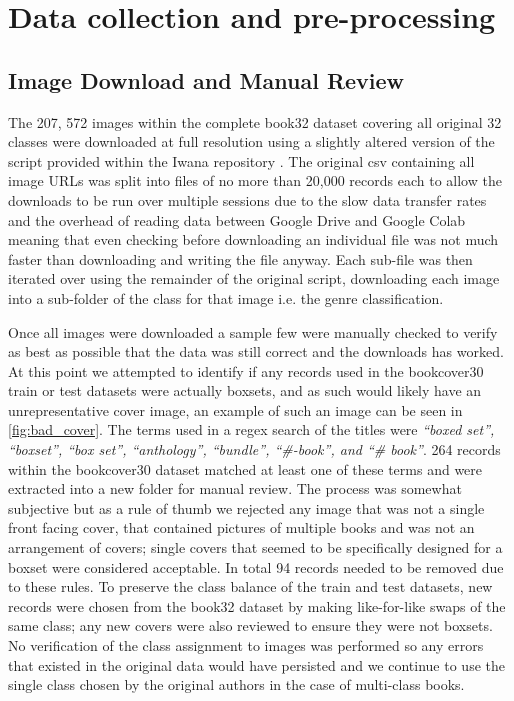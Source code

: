 \documentclass[12pt]{article}
\numberwithin{equation}{section}
\numberwithin{figure}{section}
\begin{document}
\section{Data collection and pre-processing} 
\label{sec:Data_collection_and_pre-processing} 
\subsection{Image Download and Manual Review} 
\label{sub:Image Download and Manual Review} 
The 207, 572 images within the complete book32 dataset covering all original 32 classes were downloaded at full resolution using a slightly altered version of the script provided within the Iwana repository \cite{iwanarepo}. The original csv containing all image URLs was split into files of no more than 20,000 records each to allow the downloads to be run over multiple sessions due to the slow data transfer rates and the overhead of reading data between Google Drive and Google Colab meaning that even checking before downloading an individual file was not much faster than downloading and writing the file anyway. Each sub-file was then iterated over using the remainder of the original script, downloading each image into a sub-folder of the class for that image i.e. the genre classification.

Once all images were downloaded a sample few were manually checked to verify as best as possible that the data was still correct and the downloads has worked. At this point we attempted to identify if any records used in the bookcover30 train or test datasets were actually boxsets, and as such would likely have an unrepresentative cover image, an example of such an image can be seen in \cref{fig:bad_cover}. The terms used in a regex search of the titles were \emph{``boxed set'', ``boxset'', ``box set'', ``anthology'', ``bundle'', ``\#-book'', and ``\# book''}. 264 records within the bookcover30 dataset matched at least one of these terms and were extracted into a new folder for manual review. The process was somewhat subjective but as a rule of thumb we rejected any image that was not a single front facing cover, that contained pictures of multiple books and was not an arrangement of covers; single covers that seemed to be specifically designed for a boxset were considered acceptable. In total 94 records needed to be removed due to these rules. To preserve the class balance of the train and test datasets, new records were chosen from the book32 dataset by making like-for-like swaps of the same class; any new covers were also reviewed to ensure they were not boxsets. No verification of the class assignment to images was performed so any errors that existed in the original data would have persisted and we continue to use the single class chosen by the original authors in the case of multi-class books.
\end{document}
